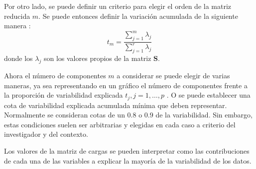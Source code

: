 \noindent Por otro lado, se puede definir un criterio para elegir el orden de la matriz reducida $m$. Se puede entonces definir la variación acumulada de la siguiente manera \cite{Chatfield 1989}:
\begin{equation}
t_m=\dfrac{\sum_{j=1}^{m}\lambda_j} {\sum_{j=1}^{r}\lambda_j}
\end{equation}
\noindent donde los $\lambda_j$ son los valores propios de la matriz $\mathbf{S}$.

\noindent Ahora el número de componentes $m$ a considerar se puede elegir de varias maneras, ya sea representando en un gráfico el número de componentes frente a la proporción de variabilidad explicada $t_j, j=1,\ldots, p$ \cite{Jollife 1986, Peña 2002}. O se puede establecer una cota de variabilidad explicada acumulada mínima que deben representar. Normalmente se consideran cotas de un $0.8$ o $0.9$ de la variabilidad. Sin embargo, estas condiciones suelen ser arbitrarias y elegidas en cada caso a criterio del investigador y del contexto. 


\noindent Los valores de la matriz de cargas se pueden interpretar como las contribuciones de cada una de las variables a explicar la mayoría de la variabilidad de los datos.



